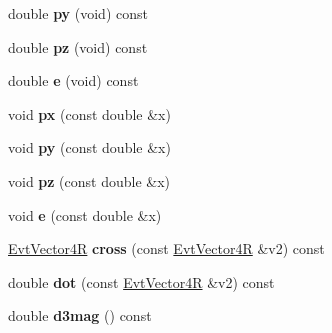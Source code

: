 \begin{DoxyCompactItemize}
\item 
\hypertarget{class_evt_vector4_r_af3a1198ed37dcba7997d5cb875d0f6e0}{}double {\bfseries py} (void) const \label{class_evt_vector4_r_af3a1198ed37dcba7997d5cb875d0f6e0}

\item 
\hypertarget{class_evt_vector4_r_af7cec443a56322a6265fef22c8a68f15}{}double {\bfseries pz} (void) const \label{class_evt_vector4_r_af7cec443a56322a6265fef22c8a68f15}

\item 
\hypertarget{class_evt_vector4_r_a1c4d37c5dc4dfd9d8b5338b0b2a731bd}{}double {\bfseries e} (void) const \label{class_evt_vector4_r_a1c4d37c5dc4dfd9d8b5338b0b2a731bd}

\item 
\hypertarget{class_evt_vector4_r_a0a51d5205eb2fb4ba4344fc8d6b6b143}{}void {\bfseries px} (const double \&x)\label{class_evt_vector4_r_a0a51d5205eb2fb4ba4344fc8d6b6b143}

\item 
\hypertarget{class_evt_vector4_r_ae58d448bdf3d01378daac7d5606caeb4}{}void {\bfseries py} (const double \&x)\label{class_evt_vector4_r_ae58d448bdf3d01378daac7d5606caeb4}

\item 
\hypertarget{class_evt_vector4_r_a457807122bc03de297959c8b9651da03}{}void {\bfseries pz} (const double \&x)\label{class_evt_vector4_r_a457807122bc03de297959c8b9651da03}

\item 
\hypertarget{class_evt_vector4_r_a3b0b77769d852a0663f31cdc9479e124}{}void {\bfseries e} (const double \&x)\label{class_evt_vector4_r_a3b0b77769d852a0663f31cdc9479e124}

\item 
\hypertarget{class_evt_vector4_r_a345005204a8c8625ae51a465e02189d7}{}\hyperlink{class_evt_vector4_r}{Evt\+Vector4\+R} {\bfseries cross} (const \hyperlink{class_evt_vector4_r}{Evt\+Vector4\+R} \&v2) const \label{class_evt_vector4_r_a345005204a8c8625ae51a465e02189d7}

\item 
\hypertarget{class_evt_vector4_r_af6b3ff80109a33e0614b26455770d8e8}{}double {\bfseries dot} (const \hyperlink{class_evt_vector4_r}{Evt\+Vector4\+R} \&v2) const \label{class_evt_vector4_r_af6b3ff80109a33e0614b26455770d8e8}

\item 
\hypertarget{class_evt_vector4_r_af0e842f4953ced13b0294a824125adc6}{}double {\bfseries d3mag} () const \label{class_evt_vector4_r_af0e842f4953ced13b0294a824125adc6}

\end{DoxyCompactItemize}
